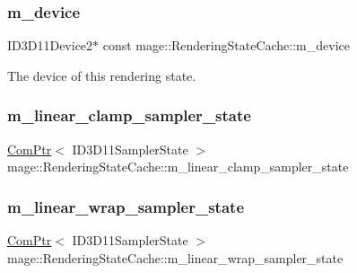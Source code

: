 \subsubsection{\texorpdfstring{m\+\_\+device}{m\_device}}
{\footnotesize\ttfamily I\+D3\+D11\+Device2$\ast$ const mage\+::\+Rendering\+State\+Cache\+::m\+\_\+device\hspace{0.3cm}{\ttfamily [private]}}

The device of this rendering state. \hypertarget{structmage_1_1_rendering_state_cache_a8086db2af33ea844744f3e81a4471af6}{}\label{structmage_1_1_rendering_state_cache_a8086db2af33ea844744f3e81a4471af6} 
\subsubsection{\texorpdfstring{m\+\_\+linear\+\_\+clamp\+\_\+sampler\+\_\+state}{m\_linear\_clamp\_sampler\_state}}
{\footnotesize\ttfamily \hyperlink{namespacemage_ae74f374780900893caa5555d1031fd79}{Com\+Ptr}$<$ I\+D3\+D11\+Sampler\+State $>$ mage\+::\+Rendering\+State\+Cache\+::m\+\_\+linear\+\_\+clamp\+\_\+sampler\+\_\+state\hspace{0.3cm}{\ttfamily [private]}}

\hypertarget{structmage_1_1_rendering_state_cache_a7f7289f3759840045dbe3dd2785199a8}{}\label{structmage_1_1_rendering_state_cache_a7f7289f3759840045dbe3dd2785199a8} 
\subsubsection{\texorpdfstring{m\+\_\+linear\+\_\+wrap\+\_\+sampler\+\_\+state}{m\_linear\_wrap\_sampler\_state}}
{\footnotesize\ttfamily \hyperlink{namespacemage_ae74f374780900893caa5555d1031fd79}{Com\+Ptr}$<$ I\+D3\+D11\+Sampler\+State $>$ mage\+::\+Rendering\+State\+Cache\+::m\+\_\+linear\+\_\+wrap\+\_\+sampler\+\_\+state\hspace{0.3cm}{\ttfamily [private]}}

